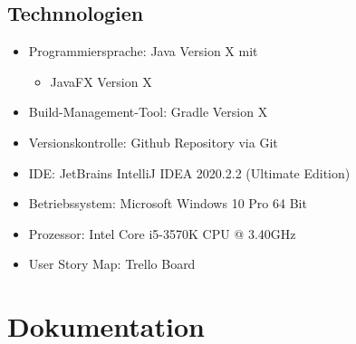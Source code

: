 \documentclass[11pt]{article}
\begin{document}
    \subsection{Technnologien}
    \begin{itemize}
        \item Programmiersprache: Java Version X mit
        \begin{itemize}
            \item JavaFX Version X
        \end{itemize}
        \item Build-Management-Tool: Gradle\cite{gradle} Version X
        \item Versionskontrolle: Github Repository\cite{github} via Git\cite{git}
        \item IDE: JetBrains IntelliJ IDEA\cite{idea} 2020.2.2 (Ultimate Edition)
        \item Betriebssystem: Microsoft Windows 10 Pro 64 Bit
        \item Prozessor: Intel Core i5-3570K CPU @ 3.40GHz
        \item User Story Map: Trello Board\cite{trello}
    \end{itemize}

    \newpage

    \section{Dokumentation}
\end{document}
